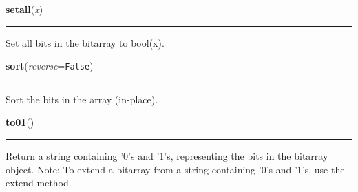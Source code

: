     \label{bitarray:_bitarray:setall}

    \vspace{0.5ex}

    \begin{boxedminipage}{\textwidth}

    \raggedright \textbf{setall}(\textit{x})

    \vspace{-1.5ex}

    \rule{\textwidth}{0.5\fboxrule}

Set all bits in the bitarray to bool(x).
    \vspace{1ex}

    \end{boxedminipage}

    \label{bitarray:_bitarray:sort}

    \vspace{0.5ex}

    \begin{boxedminipage}{\textwidth}

    \raggedright \textbf{sort}(\textit{reverse}=\texttt{False})

    \vspace{-1.5ex}

    \rule{\textwidth}{0.5\fboxrule}

Sort the bits in the array (in-place).
    \vspace{1ex}

    \end{boxedminipage}

    \label{bitarray:_bitarray:to01}

    \vspace{0.5ex}

    \begin{boxedminipage}{\textwidth}

    \raggedright \textbf{to01}()

    \vspace{-1.5ex}

    \rule{\textwidth}{0.5\fboxrule}

Return a string containing '0's and '1's, representing the bits in the
bitarray object.
Note: To extend a bitarray from a string containing '0's and '1's,
use the extend method.
    \vspace{1ex}

    \end{boxedminipage}

